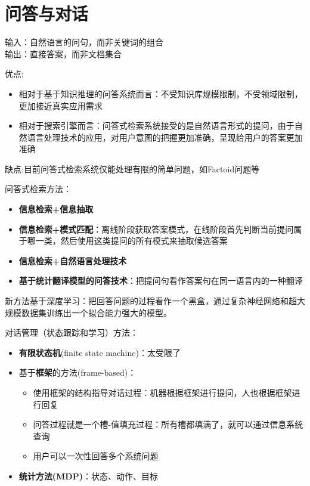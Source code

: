 
\section{问答与对话}
\begin{definition}[问答系统]
输入：自然语言的问句，而非关键词的组合\\
输出：直接答案，而非文档集合
\end{definition}

优点:
\begin{itemize}
	\item 相对于基于知识推理的问答系统而言：不受知识库规模限制，不受领域限制，更加接近真实应用需求
	\item 相对于搜索引擎而言：问答式检索系统接受的是自然语言形式的提问，由于自然语言处理技术的应用，对用户意图的把握更加准确，呈现给用户的答案更加准确
\end{itemize}
\par 缺点:目前问答式检索系统仅能处理有限的简单问题，如Factoid问题等

问答式检索方法：
\begin{itemize}
\item \textbf{信息检索+信息抽取}
\item \textbf{信息检索+模式匹配}：离线阶段获取答案模式，在线阶段首先判断当前提问属于哪一类，然后使用这类提问的所有模式来抽取候选答案
\item \textbf{信息检索+自然语言处理技术}
\item \textbf{基于统计翻译模型的问答技术}：把提问句看作答案句在同一语言内的一种翻译
\end{itemize}

新方法基于深度学习：把回答问题的过程看作一个黑盒，通过复杂神经网络和超大规模数据集训练出一个拟合能力强大的模型。

对话管理（状态跟踪和学习）方法：
\begin{itemize}
	\item \textbf{有限状态机}(finite state machine)：太受限了
	\item 基于\textbf{框架}的方法(frame-based)：
	\begin{itemize}
		\item 使用框架的结构指导对话过程：机器根据框架进行提问，人也根据框架进行回复
		\item 问答过程就是一个槽-值填充过程：所有槽都填满了，就可以通过信息系统查询
		\item 用户可以一次性回答多个系统问题
	\end{itemize}
	\item \textbf{统计方法(MDP)}：状态、动作、目标
\end{itemize}